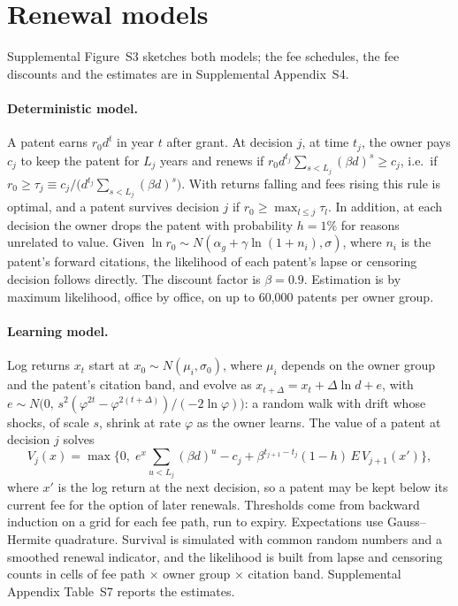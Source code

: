 \section{Renewal models}\label{app:models}

Supplemental Figure~S3 sketches both models; the fee schedules, the fee discounts and the estimates are in
Supplemental Appendix~S4.

\paragraph{Deterministic model.} A patent earns $r_0 d^t$ in year $t$ after grant. At decision $j$, at time $t_j$,
the owner pays $c_j$ to keep the patent for $L_j$ years and renews if
$r_0 d^{t_j} \sum_{s<L_j} (\beta d)^s \ge c_j$, i.e.\ if $r_0 \ge \tau_j \equiv c_j / \big(d^{t_j} \sum_{s<L_j} (\beta d)^s\big)$. With returns falling and fees rising
this rule is optimal, and a patent survives decision $j$ if $r_0 \ge \max_{l\le j}\tau_l$. In addition, at each
decision the owner drops the patent with probability $h = 1\%$ for reasons unrelated to value. Given
$\ln r_0 \sim N(\alpha_g + \gamma \ln(1+n_i), \sigma)$, where $n_i$ is the patent's forward citations, the likelihood of each patent's lapse or censoring decision
follows directly. The discount factor is $\beta = 0.9$. Estimation is by maximum likelihood, office by office, on up
to 60{,}000 patents per owner group.

\paragraph{Learning model.} Log returns $x_t$ start at $x_0 \sim N(\mu_i, \sigma_0)$, where $\mu_i$ depends on the owner group and the
patent's citation band, and evolve as
$x_{t+\Delta} = x_t + \Delta \ln d + e$, with $e \sim N\big(0,\, s^2(\varphi^{2t}-\varphi^{2(t+\Delta)})/(-2\ln\varphi)\big)$:
a random walk with drift whose shocks, of scale $s$, shrink at rate $\varphi$ as the owner learns. The value of a patent at decision
$j$ solves
\[
V_j(x) = \max\Big\{0,\; e^x \sum_{u<L_j} (\beta d)^u - c_j + \beta^{t_{j+1}-t_j} (1-h)\, E\,V_{j+1}(x')\Big\},
\]
where $x'$ is the log return at the next decision, so a patent may be kept below its current fee for the option of later renewals. Thresholds come from backward
induction on a grid for each fee path, run to expiry. Expectations use Gauss--Hermite quadrature. Survival is
simulated with common random numbers and a smoothed renewal indicator, and the likelihood is built from lapse and
censoring counts in cells of fee path $\times$ owner group $\times$ citation band. Supplemental Appendix
Table~S7 reports the estimates.

